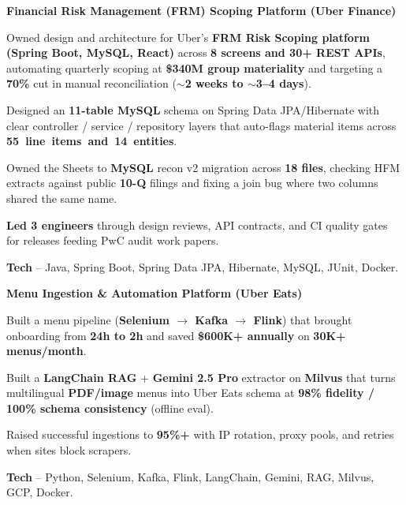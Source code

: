 \textcolor{Project}{\textbf{Financial Risk Management (FRM) Scoping Platform (Uber Finance)}}
\vspace{-1ex}
\begin{zitemize}
    \item Owned design and architecture for Uber's \textbf{FRM Risk Scoping platform (Spring Boot, MySQL, React)} across \textbf{8 screens and 30+ REST APIs}, automating quarterly scoping at \textbf{\$340M group materiality} and targeting a \textbf{70\%} cut in manual reconciliation (\textbf{$\sim$2 weeks to $\sim$3--4 days}).
    \item Designed an \textbf{11-table MySQL} schema on Spring Data JPA/Hibernate with clear controller / service / repository layers that auto-flags material items across \mbox{\textbf{55 line items and 14 entities}}.
    \item Owned the Sheets to \textbf{MySQL} recon v2 migration across \textbf{18 files}, checking HFM extracts against public \textbf{10-Q} filings and fixing a join bug where two columns shared the same name.
    \item \textbf{Led 3 engineers} through design reviews, API contracts, and CI quality gates for releases feeding PwC audit work papers.
    \item \textbf{Tech} -- Java, Spring Boot, Spring Data JPA, Hibernate, MySQL, JUnit, Docker.
\end{zitemize}
\vspace{0.3ex}

\textcolor{Project}{\textbf{Menu Ingestion \& Automation Platform (Uber Eats)}}
\vspace{-1ex}
\begin{zitemize}
    \item Built a menu pipeline (\textbf{Selenium $\rightarrow$ Kafka $\rightarrow$ Flink}) that brought onboarding from \textbf{24h to 2h} and saved \textbf{\$600K+ annually} on \textbf{30K+ menus/month}.
    \item Built a \textbf{LangChain RAG} + \textbf{Gemini 2.5 Pro} extractor on \textbf{Milvus} that turns multilingual \textbf{PDF/image} menus into Uber Eats schema at \textbf{98\% fidelity / 100\% schema consistency} (offline eval).
    \item Raised successful ingestions to \textbf{95\%+} with IP rotation, proxy pools, and retries when sites block scrapers.
    \item \textbf{Tech} -- Python, Selenium, Kafka, Flink, LangChain, Gemini, RAG, Milvus, GCP, Docker.
\end{zitemize}
\vspace{0.15ex}


